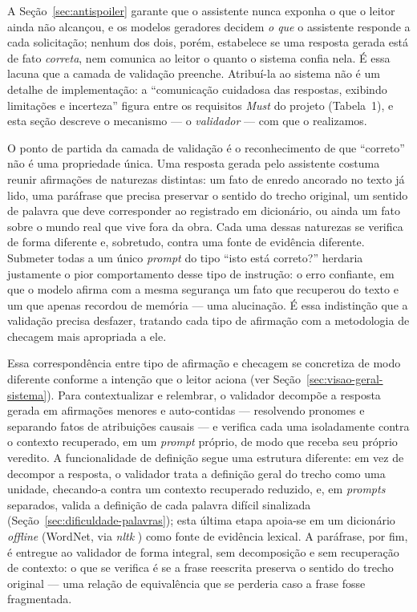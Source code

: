 A Seção~\ref{sec:antispoiler} garante que o assistente nunca exponha o que o leitor ainda não alcançou, e os modelos geradores decidem \textit{o que} o assistente responde a cada solicitação; nenhum dos dois, porém, estabelece se uma resposta gerada está de fato \textit{correta}, nem comunica ao leitor o quanto o sistema confia nela. É essa lacuna que a camada de validação preenche. Atribuí-la ao sistema não é um detalhe de implementação: a ``comunicação cuidadosa das respostas, exibindo limitações e incerteza'' figura entre os requisitos \textit{Must} do projeto (Tabela~1), e esta seção descreve o mecanismo --- o \textit{validador} --- com que o realizamos.

O ponto de partida da camada de validação é o reconhecimento de que ``correto'' não é uma propriedade única. Uma resposta gerada pelo assistente costuma reunir afirmações de naturezas distintas: um fato de enredo ancorado no texto já lido, uma paráfrase que precisa preservar o sentido do trecho original, um sentido de palavra que deve corresponder ao registrado em dicionário, ou ainda um fato sobre o mundo real que vive fora da obra. Cada uma dessas naturezas se verifica de forma diferente e, sobretudo, contra uma fonte de evidência diferente. Submeter todas a um único \textit{prompt} do tipo ``isto está correto?'' herdaria justamente o pior comportamento desse tipo de instrução: o erro confiante, em que o modelo afirma com a mesma segurança um fato que recuperou do texto e um que apenas recordou de memória --- uma alucinação. É essa indistinção que a validação precisa desfazer, tratando cada tipo de afirmação com a metodologia de checagem mais apropriada a ele.

Essa correspondência entre tipo de afirmação e checagem se concretiza de modo diferente conforme a intenção que o leitor aciona (ver Seção~\ref{sec:visao-geral-sistema}). Para contextualizar e relembrar, o validador decompõe a resposta gerada em afirmações menores e auto-contidas --- resolvendo pronomes e separando fatos de atribuições causais --- e verifica cada uma isoladamente contra o contexto recuperado, em um \textit{prompt} próprio, de modo que receba seu próprio veredito. A funcionalidade de definição segue uma estrutura diferente: em vez de decompor a resposta, o validador trata a definição geral do trecho como uma unidade, checando-a contra um contexto recuperado reduzido, e, em \textit{prompts} separados, valida a definição de cada palavra difícil sinalizada (Seção~\ref{sec:dificuldade-palavras}); esta última etapa apoia-se em um dicionário \textit{offline} (WordNet, via \textit{nltk} \cite{miller1992wordnet}) como fonte de evidência lexical. A paráfrase, por fim, é entregue ao validador de forma integral, sem decomposição e sem recuperação de contexto: o que se verifica é se a frase reescrita preserva o sentido do trecho original --- uma relação de equivalência que se perderia caso a frase fosse fragmentada.
